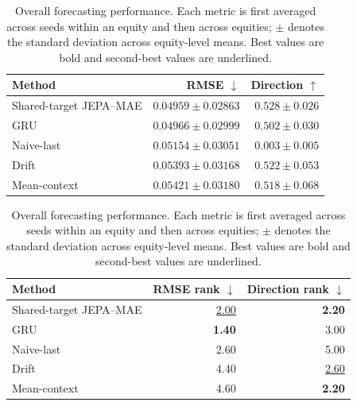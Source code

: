 \begin{table}[t]
\centering
\small
\caption{Overall forecasting performance. Each metric is first averaged across seeds within an equity and then across equities; $\pm$ denotes the standard deviation across equity-level means. Best values are bold and second-best values are underlined.}
\label{tab:main_metrics}
\begin{tabular}{lrr}
\toprule
Method & RMSE $\downarrow$ & Direction $\uparrow$ \\
\midrule
Shared-target JEPA--MAE & \textbf{$0.04959 \pm 0.02863$} & \textbf{$0.528 \pm 0.026$} \\
GRU & \underline{$0.04966 \pm 0.02999$} & $0.502 \pm 0.030$ \\
Naive-last & $0.05154 \pm 0.03051$ & $0.003 \pm 0.005$ \\
Drift & $0.05393 \pm 0.03168$ & \underline{$0.522 \pm 0.053$} \\
Mean-context & $0.05421 \pm 0.03180$ & $0.518 \pm 0.068$ \\
\bottomrule
\end{tabular}
\par\medskip
\begin{tabular}{lrr}
\toprule
Method & RMSE rank $\downarrow$ & Direction rank $\downarrow$ \\
\midrule
Shared-target JEPA--MAE & \underline{2.00} & \textbf{2.20} \\
GRU & \textbf{1.40} & 3.00 \\
Naive-last & 2.60 & 5.00 \\
Drift & 4.40 & \underline{2.60} \\
Mean-context & 4.60 & \textbf{2.20} \\
\bottomrule
\end{tabular}
\end{table}
